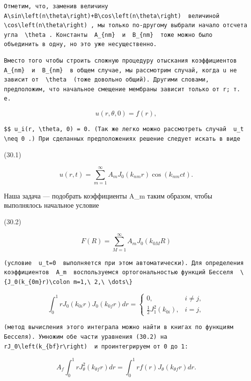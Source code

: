 \documentclass[
  ukrainian,
]{article}
\begin{document}
\begin{verbatim}
Отметим, что, заменив величину  A\sin\left(n\theta\right)+B\cos\left(n\theta\right)  величиной  \cos\left(n\theta\right) , мы только по-другому выбрали начало отсчета угла  \theta . Константы  A_{nm}  и  B_{nm}  тоже можно было объединить в одну, но это уже несущественно.
\end{verbatim}

\begin{verbatim}
Вместо того чтобы строить сложную процедуру отыскания коэффициентов  A_{nm}  и  B_{nm}  в общем случае, мы рассмотрим случай, когда u не зависит от  \theta  (тоже довольно общий). Другими словами, предположим, что начальное смещение мембраны зависит только от r; т. е.
\end{verbatim}

\[
u(r, \theta, 0) = f(r),
\]

\begin{verbatim}
$$ u_i(r, \theta, 0) = 0. (Так же легко можно рассмотреть случай  u_t \neq 0 .) При сделанных предположениях решение следует искать в виде
\end{verbatim}

(30.1)

\[
u(r, t) = \sum_{m=1}^{\infty} A_m J_0(k_{nm}r) \cos(k_{nm}ct).
\]

Наша задача --- подобрать коэффициенты A\_m таким образом, чтобы
выполнялось начальное условие

(30.2)

\[
F(R) = \sum_{M=1}^{\infty} A_m J_0(k_{0M}R)
\]

\begin{verbatim}
(условие  u_t=0  выполняется при этом автоматически). Для определения коэффициентов  A_m  воспользуемся ортогональностью функций Бесселя  \{J_0(k_{0m}r)\colon m=1,\ 2,\ \dots\}
\end{verbatim}

\[
\int_{0}^{1} r J_{0}(k_{0i}r) J_{0}(k_{0f}r) dr = \begin{cases} 0, & i \neq j, \\ \frac{1}{2} J_{1}^{2}(k_{0i}), & i = j, \end{cases}
\]

\begin{verbatim}
(метод вычисления этого интеграла можно найти в книгах по функциям Бесселя). Умножим обе части уравнения (30.2) на  rJ_0\left(k_{bf}r\right)  и проинтегрируем от 0 до 1:
\end{verbatim}

\[
A_{f}\int_{0}^{1}rJ_{\theta}^{2}(k_{\theta f}r)dr=\int_{0}^{1}rf(r)J_{\theta}(k_{\theta f}r)dr.
\]
\end{document}
